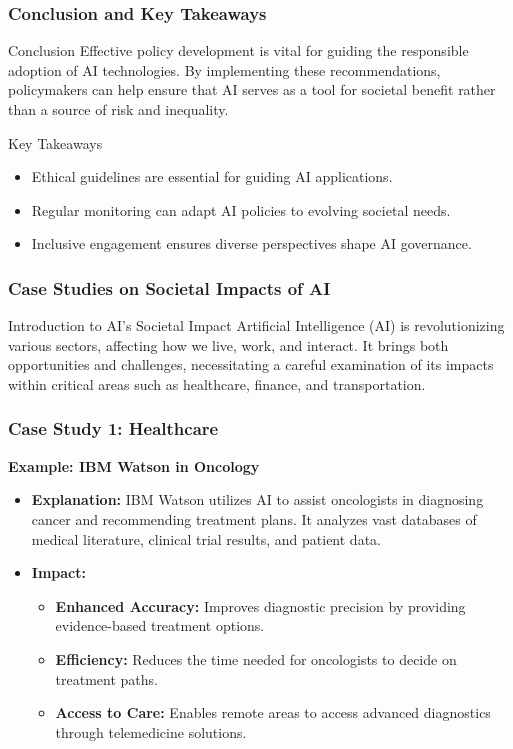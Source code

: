 \documentclass[aspectratio=169]{beamer}
\begin{document}
\begin{frame}[fragile]
    \frametitle{Conclusion and Key Takeaways}

    \begin{block}{Conclusion}
        Effective policy development is vital for guiding the responsible adoption of AI technologies. By implementing these recommendations, policymakers can help ensure that AI serves as a tool for societal benefit rather than a source of risk and inequality.
    \end{block}

    \begin{block}{Key Takeaways}
        \begin{itemize}
            \item Ethical guidelines are essential for guiding AI applications.
            \item Regular monitoring can adapt AI policies to evolving societal needs.
            \item Inclusive engagement ensures diverse perspectives shape AI governance.
        \end{itemize}
    \end{block}
\end{frame}

\begin{frame}[fragile]
    \frametitle{Case Studies on Societal Impacts of AI}
    \begin{block}{Introduction to AI's Societal Impact}
        Artificial Intelligence (AI) is revolutionizing various sectors, affecting how we live, work, and interact. 
        It brings both opportunities and challenges, necessitating a careful examination of its impacts within critical areas such as healthcare, finance, and transportation.
    \end{block}
\end{frame}

\begin{frame}[fragile]
    \frametitle{Case Study 1: Healthcare}
    \textbf{Example: IBM Watson in Oncology}
    \begin{itemize}
        \item \textbf{Explanation:} IBM Watson utilizes AI to assist oncologists in diagnosing cancer and recommending treatment plans. It analyzes vast databases of medical literature, clinical trial results, and patient data.
        \item \textbf{Impact:}
        \begin{itemize}
            \item \textbf{Enhanced Accuracy:} Improves diagnostic precision by providing evidence-based treatment options.
            \item \textbf{Efficiency:} Reduces the time needed for oncologists to decide on treatment paths.
            \item \textbf{Access to Care:} Enables remote areas to access advanced diagnostics through telemedicine solutions.
        \end{itemize}
    \end{itemize}
\end{frame}
\end{document}
